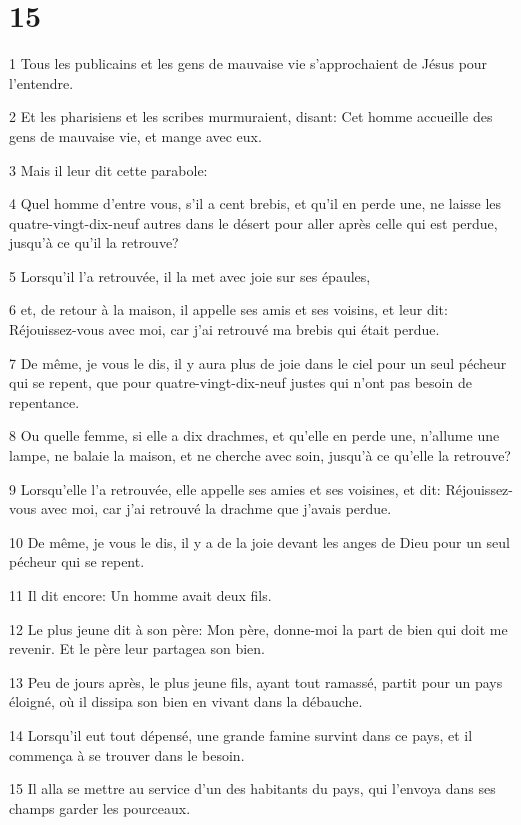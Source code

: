 \chapter{15}

\par 1 Tous les publicains et les gens de mauvaise vie s'approchaient de Jésus pour l'entendre.
\par 2 Et les pharisiens et les scribes murmuraient, disant: Cet homme accueille des gens de mauvaise vie, et mange avec eux.
\par 3 Mais il leur dit cette parabole:
\par 4 Quel homme d'entre vous, s'il a cent brebis, et qu'il en perde une, ne laisse les quatre-vingt-dix-neuf autres dans le désert pour aller après celle qui est perdue, jusqu'à ce qu'il la retrouve?
\par 5 Lorsqu'il l'a retrouvée, il la met avec joie sur ses épaules,
\par 6 et, de retour à la maison, il appelle ses amis et ses voisins, et leur dit: Réjouissez-vous avec moi, car j'ai retrouvé ma brebis qui était perdue.
\par 7 De même, je vous le dis, il y aura plus de joie dans le ciel pour un seul pécheur qui se repent, que pour quatre-vingt-dix-neuf justes qui n'ont pas besoin de repentance.
\par 8 Ou quelle femme, si elle a dix drachmes, et qu'elle en perde une, n'allume une lampe, ne balaie la maison, et ne cherche avec soin, jusqu'à ce qu'elle la retrouve?
\par 9 Lorsqu'elle l'a retrouvée, elle appelle ses amies et ses voisines, et dit: Réjouissez-vous avec moi, car j'ai retrouvé la drachme que j'avais perdue.
\par 10 De même, je vous le dis, il y a de la joie devant les anges de Dieu pour un seul pécheur qui se repent.
\par 11 Il dit encore: Un homme avait deux fils.
\par 12 Le plus jeune dit à son père: Mon père, donne-moi la part de bien qui doit me revenir. Et le père leur partagea son bien.
\par 13 Peu de jours après, le plus jeune fils, ayant tout ramassé, partit pour un pays éloigné, où il dissipa son bien en vivant dans la débauche.
\par 14 Lorsqu'il eut tout dépensé, une grande famine survint dans ce pays, et il commença à se trouver dans le besoin.
\par 15 Il alla se mettre au service d'un des habitants du pays, qui l'envoya dans ses champs garder les pourceaux.
